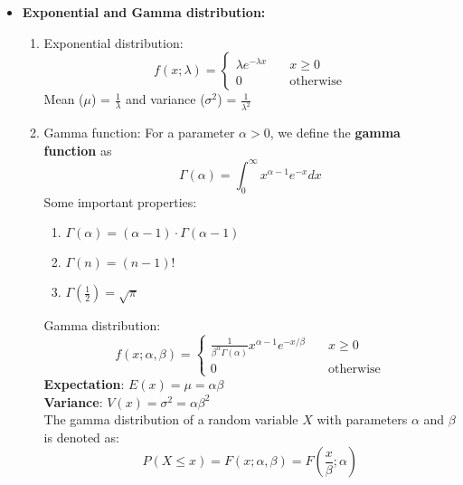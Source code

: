 \documentclass[a4paper]{article}
\begin{document}
\begin{itemize}
    \item \textbf{Exponential and Gamma distribution:}
    \begin{enumerate}
        \item Exponential distribution:
        \begin{equation*}
            f(x;\lambda) = \begin{cases}
            \lambda e^{-\lambda x}\quad & x\geq 0\\
            0\quad & \text{otherwise}
            \end{cases}
        \end{equation*}
        Mean ($\mu$) = $\frac{1}{\lambda}$ and variance ($\sigma^2$) = $\frac{1}{\lambda^2}$
        \item Gamma function: For a parameter $\alpha > 0$, we define the \textbf{gamma function} as
        \begin{equation*}
            \Gamma(\alpha) = \int_{0}^{\infty}x^{\alpha-1}e^{-x}dx
        \end{equation*}
        Some important properties:
        \begin{enumerate}
            \item $\Gamma(\alpha) = (\alpha-1)\cdot\Gamma(\alpha-1)$
            \item $\Gamma(n) = (n-1)!$
            \item $\Gamma(\frac{1}{2}) = \sqrt{\pi}$
        \end{enumerate}
        Gamma distribution:
        \begin{equation*}
            f(x; \alpha,\beta) = \begin{cases}
              \frac{1}{\beta^\alpha\Gamma(\alpha)}x^{\alpha-1}e^{-x/\beta}\quad & x\geq 0\\
              0 \quad &\text{otherwise}
            \end{cases}
        \end{equation*}
        \textbf{Expectation}: $E(x) = \mu = \alpha\beta$\\
        \textbf{Variance}: $V(x) = \sigma^2 = \alpha\beta^2$\\
        The gamma distribution of a random variable $X$ with parameters $\alpha$ and $\beta$ is denoted as:
        \begin{equation*}
            P(X\leq x) = F(x; \alpha,\beta) = F\left(\frac{x}{\beta}; \alpha\right)
        \end{equation*}
    \end{enumerate}
        
\end{itemize}
\end{document}
